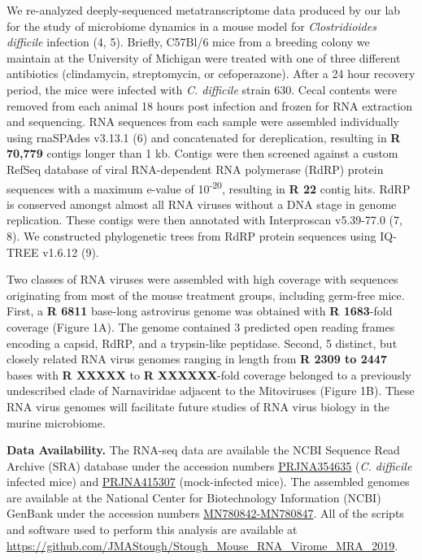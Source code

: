 \documentclass[11pt,]{article}
\begin{document}
We re-analyzed deeply-sequenced metatranscriptome data produced by our
lab for the study of microbiome dynamics in a mouse model for
\emph{Clostridioides difficile} infection (4, 5). Briefly, C57Bl/6 mice
from a breeding colony we maintain at the University of Michigan were
treated with one of three different antibiotics (clindamycin,
streptomycin, or cefoperazone). After a 24 hour recovery period, the
mice were infected with \emph{C. difficile} strain 630. Cecal contents
were removed from each animal 18 hours post infection and frozen for RNA
extraction and sequencing. RNA sequences from each sample were assembled
individually using rnaSPAdes v3.13.1 (6) and concatenated for
dereplication, resulting in \textbf{R 70,779} contigs longer than 1 kb.
Contigs were then screened against a custom RefSeq database of viral
RNA-dependent RNA polymerase (RdRP) protein sequences with a maximum
e-value of 10\textsuperscript{-20}, resulting in \textbf{R 22} contig
hits. RdRP is conserved amongst almost all RNA viruses without a DNA
stage in genome replication. These contigs were then annotated with
Interproscan v5.39-77.0 (7, 8). We constructed phylogenetic trees from
RdRP protein sequences using IQ-TREE v1.6.12 (9).

Two classes of RNA viruses were assembled with high coverage with
sequences originating from most of the mouse treatment groups, including
germ-free mice. First, a \textbf{R 6811} base-long astrovirus genome was
obtained with \textbf{R 1683}-fold coverage (Figure 1A). The genome
contained 3 predicted open reading frames encoding a capsid, RdRP, and a
trypsin-like peptidase. Second, 5 distinct, but closely related RNA
virus genomes ranging in length from \textbf{R 2309 to 2447} bases with
\textbf{R XXXXX} to \textbf{R XXXXXX}-fold coverage belonged to a
previously undescribed clade of Narnaviridae adjacent to the Mitoviruses
(Figure 1B). These RNA virus genomes will facilitate future studies of
RNA virus biology in the murine microbiome.

\textbf{Data Availability.} The RNA-seq data are available the NCBI
Sequence Read Archive (SRA) database under the accession numbers
\href{https://www.ncbi.nlm.nih.gov/bioproject/354635}{PRJNA354635}
(\emph{C. difficile} infected mice) and
\href{https://www.ncbi.nlm.nih.gov/bioproject/415307}{PRJNA415307}
(mock-infected mice). The assembled genomes are available at the
National Center for Biotechnology Information (NCBI) GenBank under the
accession numbers \href{}{MN780842-MN780847}. All of the scripts and
software used to perform this analysis are available at
\url{https://github.com/JMAStough/Stough_Mouse_RNA_Virome_MRA_2019}.
\end{document}
